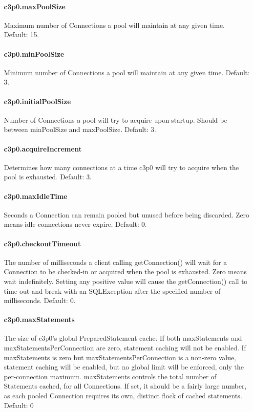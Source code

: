 \paragraph{c3p0.maxPoolSize}
Maximum number of Connections a pool will maintain at any given time.
Default: 15.

\paragraph{c3p0.minPoolSize}
Minimum number of Connections a pool will maintain at any given time.
Default: 3.

\paragraph{c3p0.initialPoolSize}
Number of Connections a pool will try to acquire upon startup. Should be between
minPoolSize and maxPoolSize.
Default: 3.

\paragraph{c3p0.acquireIncrement}
Determines how many connections at a time c3p0 will try to acquire when the pool
is exhausted.
Default: 3.

\paragraph{c3p0.maxIdleTime}
Seconds a Connection can remain pooled but unused before being discarded. Zero
means idle connections never expire.
Default: 0.

\paragraph{c3p0.checkoutTimeout}
The number of milliseconds a client calling getConnection() will wait for a Connection
to be checked-in or acquired when the pool is exhausted. Zero means wait indefinitely.
Setting any positive value will cause the getConnection() call to time-out and
break with an SQLException after the specified number of milliseconds.
Default: 0.

\paragraph{c3p0.maxStatements}
The size of c3p0's global PreparedStatement cache. If both maxStatements and
maxStatementsPerConnection are zero, statement caching will not be enabled.
If maxStatements is zero but maxStatementsPerConnection is a non-zero value,
statement caching will be enabled, but no global limit will be enforced, only
the per-connection maximum. maxStatements controls the total number of Statements
cached, for all Connections. If set, it should be a fairly large number, as each
pooled Connection requires its own, distinct flock of cached statements.
Default: 0

